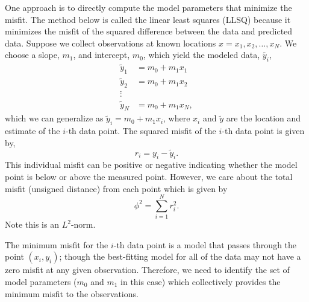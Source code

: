 One approach is to directly compute the model parameters that minimize the misfit.  The method below is called the linear least squares (LLSQ) because it minimizes the misfit of the squared difference between the data and predicted data.  Suppose we collect observations at known locations $x = x_1,x_2,\ldots,x_N$.  We choose a slope, $m_1$, and intercept, $m_0$, which yield the modeled data, $\tilde{y_i}$,
\begin{align*}
    \tilde{y}_1 &= m_0 + m_1 x_1 \\
    \tilde{y}_2 &= m_0 + m_1 x_2 \\
    \vdots \\      
    \tilde{y}_N &= m_0 + m_1 x_N ,
\end{align*}
which we can generalize as $\tilde{y}_i = m_0 + m_1 x_i$, where $x_i$ and $\tilde{y}$ are the location and estimate of the $i$-th data point.  The squared misfit of the $i$-th data point is given by,
\begin{equation*}
    r_i = y_i - \tilde{y}_i .
\end{equation*}
This individual misfit can be positive or negative indicating whether the model point is below or above the measured point.  However, we care about the total misfit (unsigned distance) from each point which is given by
\begin{equation*}
    \phi^2 = \sum_{i=1}^N r_i^2 .
\end{equation*}
Note this is an $L^2$-norm.

The minimum misfit for the $i$-th data point is a model that passes through the point $(x_i, y_i)$; though the best-fitting model for all of the data may not have a zero misfit at any given observation.  Therefore, we need to identify the set of model parameters ($m_0$ and $m_1$ in this case) which collectively provides the minimum misfit to the observations.

